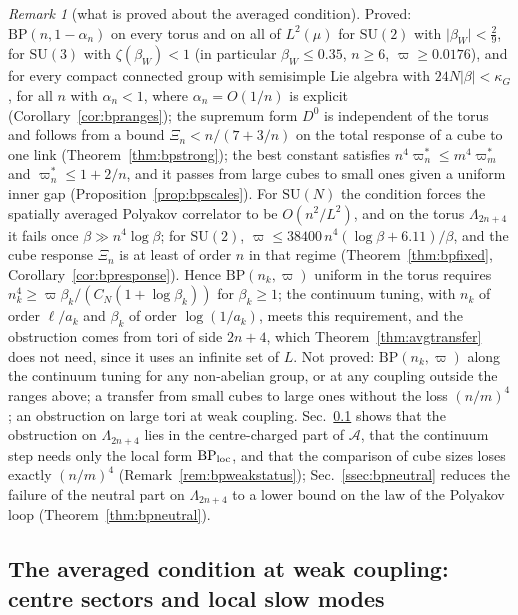 \documentclass[aps,prd,twocolumn,superscriptaddress,nofootinbib,longbibliography,floatfix,amsmath,amssymb,10pt]{revtex4-2}
\theoremstyle{definition}
\theoremstyle{remark}
\newtheorem{remark}[theorem]{Remark}
\newcommand{\SU}{\mathrm{SU}}
\begin{document}
\begin{remark}[what is proved about the averaged condition]\label{rem:bpstatus}
Proved: $\mathrm{BP}(n,1-\alpha_n)$ on every torus and on all of $L^2(\mu)$
for $\SU(2)$ with $\lvert\beta_W\rvert<\frac29$, for $\SU(3)$ with $\zeta(
\beta_W)<1$ (in particular $\beta_W\le0.35$, $n\ge6$, $\varpi\ge0.0176$),
and for every compact connected group with semisimple Lie algebra with
$24N\lvert\beta\rvert<\kappa_G$, for all $n$ with $\alpha_n<1$, where
$\alpha_n=O(1/n)$ is explicit (Corollary~\ref{cor:bpranges}); the
supremum form $D^0$ is independent of the torus and follows from a bound
$\Xi_n<n/(7+3/n)$ on the total response of a cube to one link
(Theorem~\ref{thm:bpstrong}); the best constant satisfies $n^4\varpi^*_n
\le m^4\varpi^*_m$ and $\varpi^*_n\le1+2/n$, and it passes from large
cubes to small ones given a uniform inner gap
(Proposition~\ref{prop:bpscales}). For $\SU(N)$ the condition forces the
spatially averaged Polyakov correlator to be $O(n^2/L^2)$, and on the
torus $\Lambda_{2n+4}$ it fails once $\beta\gg n^4\log\beta$; for $\SU(2)$,
$\varpi\le38400\,n^4(\log\beta+6.11)/\beta$, and the cube response
$\Xi_n$ is at least of order $n$ in that regime
(Theorem~\ref{thm:bpfixed}, Corollary~\ref{cor:bpresponse}). Hence
$\mathrm{BP}(n_k,\varpi)$ uniform in the torus requires $n_k^4\ge\varpi
\beta_k/(C_N(1+\log\beta_k))$ for $\beta_k\ge1$; the continuum tuning, with
$n_k$ of order $\ell/a_k$ and $\beta_k$ of order $\log(1/a_k)$, meets this
requirement, and the obstruction
comes from tori of side $2n+4$, which Theorem~\ref{thm:avgtransfer} does
not need, since it uses an infinite set of $L$. Not proved:
$\mathrm{BP}(n_k,\varpi)$ along the continuum tuning for any non-abelian
group, or at any coupling outside the ranges above; a transfer from small
cubes to large ones without the loss $(n/m)^4$; an obstruction on large
tori at weak coupling. Sec.~\ref{ssec:bpweak} shows that the obstruction on
$\Lambda_{2n+4}$ lies in the centre-charged part of $\mathcal A$, that the
continuum step needs only the local form $\mathrm{BP}_{\rm loc}$, and that
the comparison of cube sizes loses exactly $(n/m)^4$
(Remark~\ref{rem:bpweakstatus}); Sec.~\ref{ssec:bpneutral} reduces the
failure of the neutral part on $\Lambda_{2n+4}$ to a lower bound on the law
of the Polyakov loop (Theorem~\ref{thm:bpneutral}).
\end{remark}

\subsection{The averaged condition at weak coupling: centre sectors and
local slow modes}\label{ssec:bpweak}
\end{document}
